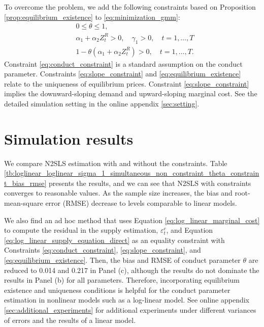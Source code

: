 \documentclass[11pt, a4paper]{article}
\theoremstyle{remark}
\begin{document}
To overcome the problem, we add the following constraints based on Proposition \ref{prop:equilibrium_existence} to \eqref{eq:minimization_gmm}:
\begin{align}
    &0\le\theta \le 1,\label{eq:conduct_constraint}\\
    &\alpha_1 + \alpha_2 Z_{t}^{R} >0, \quad \gamma_1>0 ,\quad t = 1,\ldots, T\label{eq:slope_constraint}\\
    &1- \theta(\alpha_1 + \alpha_2 Z_{t}^{R}) >0,\quad t = 1,\ldots, T.\label{eq:equilibrium_existence}
\end{align}
Constraint \eqref{eq:conduct_constraint} is a standard assumption on the conduct parameter.
Constraints \eqref{eq:slope_constraint} and \eqref{eq:equilibrium_existence} relate to the uniqueness of equilibrium prices. 
Constraint \eqref{eq:slope_constraint} implies the downward-sloping demand and upward-sloping marginal cost. 
See the detailed simulation setting in the online appendix \ref{sec:setting}.

















\section{Simulation results}\label{sec:results}

We compare N2SLS estimation with and without the constraints.
Table \ref{tb:loglinear_loglinear_sigma_1_simultaneous_non_constraint_theta_constraint_bias_rmse} presents the results, and we can see that N2SLS with constraints converges to reasonable values. 
As the sample size increases, the bias and root-mean-square error (RMSE) decrease to levels comparable to linear models.

We also find an ad hoc method that uses Equation \eqref{eq:log_linear_marginal_cost} to compute the residual in the supply estimation, $\varepsilon_{t}^c$, and Equation \eqref{eq:log_linear_supply_equation_direct} as an equality constraint with  Constraints \eqref{eq:conduct_constraint}, \eqref{eq:slope_constraint}, and \eqref{eq:equilibrium_existence}. 
Then, the bias and RMSE of conduct parameter $\theta$ are reduced to 0.014 and 0.217 in Panel (c), although the results do not dominate the results in Panel (b) for all parameters.
Therefore, incorporating equilibrium existence and uniqueness conditions is helpful for the conduct parameter estimation in nonlinear models such as a log-linear model.
See online appendix \ref{sec:additional_experiments} for additional experiments under different variances of errors and the results of a linear model. 
\end{document}
